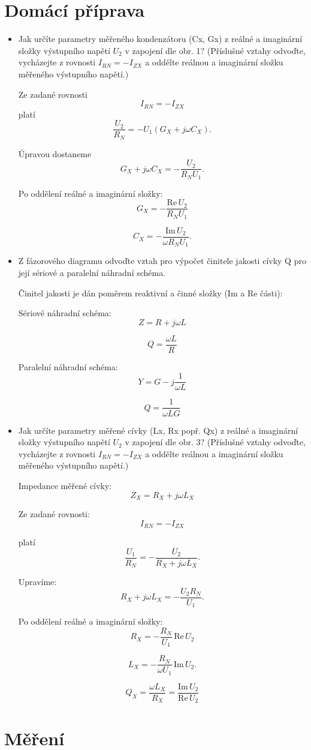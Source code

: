 \documentclass[a4paper,12pt]{article}
\begin{document}
\section{Domácí příprava}
\begin{itemize}
  \item Jak určíte parametry měřeného kondenzátoru (Cx, Gx) z reálné a imaginární složky výstupního napětí $U_2$ v zapojení dle obr. 1? (Příslušné vztahy odvoďte, vycházejte z rovnosti $I_{RN} = -I_{ZX}$ a oddělte reálnou a imaginární složku měřeného výstupního napětí.)
    
    
    Ze zadané rovnosti
    $$
      I_{RN} = -I_{ZX}
    $$
    platí
    $$
      \frac{U_2}{R_N} = -U_1 \left(G_X + j\omega C_X\right).
    $$

    Úpravou dostaneme
    $$
      G_X + j\omega C_X = -\frac{U_2}{R_N U_1}.
    $$

    Po oddělení reálné a imaginární složky:
    $$
      G_X = -\frac{\mathrm{Re}\,U_2}{R_N U_1}
    $$

    $$
      C_X = -\frac{\mathrm{Im}\,U_2}{\omega R_N U_1}.
    $$
    
  \item Z fázorového diagramu odvoďte vztah pro výpočet činitele jakosti cívky Q pro její sériové a paralelní náhradní schéma.
    
    
    Činitel jakosti je dán poměrem reaktivní a činné složky (Im a Re části):

    Sériové náhradní schéma:
    $$
      Z = R + j\omega L
    $$

    $$
      Q = \frac{\omega L}{R}
    $$

    Paralelní náhradní schéma:
    $$
      Y = G - j\frac{1}{\omega L}
    $$

    $$
      Q = \frac{1}{\omega L G}
    $$
    
  \item Jak určíte parametry měřené cívky (Lx, Rx popř. Qx) z reálné a imaginární složky výstupního napětí $U_2$ v zapojení dle obr. 3? (Příslušné vztahy odvoďte, vycházejte z rovnosti $I_{RN} = -I_{ZX}$ a oddělte reálnou a imaginární složku měřeného výstupního napětí.)
    
  
    Impedance měřené cívky:
    $$
      Z_X = R_X + j\omega L_X
    $$

    Ze zadané rovnosti:
    $$
      I_{RN} = -I_{ZX}
    $$

    platí
    $$
      \frac{U_1}{R_N} = -\frac{U_2}{R_X + j\omega L_X}.
    $$

    Upravíme:
    $$
      R_X + j\omega L_X = -\frac{U_2 R_N}{U_1}.
    $$

    Po oddělení reálné a imaginární složky:
    $$
      R_X = -\frac{R_N}{U_1}\,\mathrm{Re}\,U_2
    $$

    $$
      L_X = -\frac{R_N}{\omega U_1}\,\mathrm{Im}\,U_2.
    $$

    $$
      Q_X = \frac{\omega L_X}{R_X}
      = \frac{\mathrm{Im}\,U_2}{\mathrm{Re}\,U_2}
    $$
    
\end{itemize}

\section{Měření}
\end{document}
